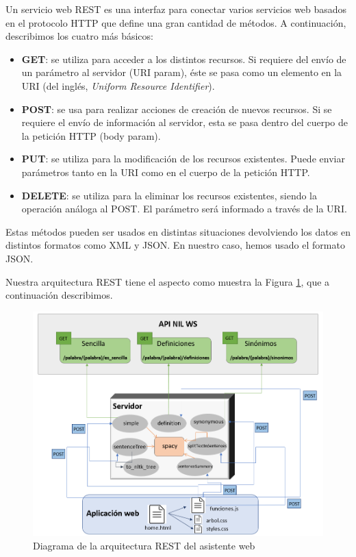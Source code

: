 Un servicio web REST es una interfaz para conectar varios servicios web basados en el protocolo HTTP que define una gran cantidad de métodos. A continuación, describimos los cuatro más básicos:
\begin{itemize}
	\item \textbf{GET}: se utiliza para acceder a los distintos recursos. Si requiere del envío de un parámetro al servidor (URI param), éste se pasa como un elemento en la URI (del inglés, \textit{Uniform Resource Identifier}). 
	
	\item \textbf{POST}: se usa para realizar acciones de creación de nuevos recursos. Si se requiere el envío de información al servidor, esta se pasa dentro del cuerpo de la petición HTTP (body param).
	
	\item \textbf{PUT}: se utiliza para la modificación de los recursos existentes. Puede enviar parámetros tanto en la URI como en el cuerpo de la petición HTTP.
	
	\item \textbf{DELETE}: se utiliza para la eliminar los recursos existentes, siendo la operación análoga al POST. El parámetro será informado a través de la URI.
\end{itemize}

Estas métodos pueden ser usados en distintas situaciones devolviendo los datos en distintos formatos como XML y JSON.
En nuestro caso, hemos usado el formato JSON.

Nuestra arquitectura REST tiene el aspecto como muestra la Figura \ref{fig:ArquitecturaAsistenteR}, que a continuación describimos.
\begin{figure}[h!]
	\centering
	
	
	\includegraphics[scale=0.9]{Imagenes/Figuras/ArquitecturaAsistenteR}
	
	
	\caption{Diagrama de la arquitectura REST del asistente web}
	\label{fig:ArquitecturaAsistenteR}
\end{figure}

